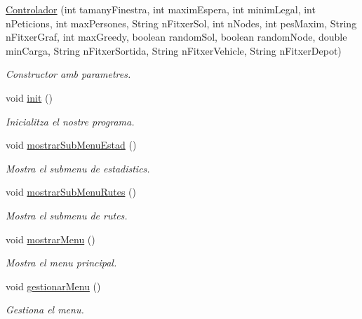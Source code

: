 \begin{DoxyCompactItemize}
\item 
\hyperlink{class_portam_a_pro_p_1_1_controlador_a262bc14ad6aa78a5d311f093227b4d9c}{Controlador} (int tamany\+Finestra, int maxim\+Espera, int minim\+Legal, int n\+Peticions, int max\+Persones, String n\+Fitxer\+Sol, int n\+Nodes, int pes\+Maxim, String n\+Fitxer\+Graf, int max\+Greedy, boolean random\+Sol, boolean random\+Node, double min\+Carga, String n\+Fitxer\+Sortida, String n\+Fitxer\+Vehicle, String n\+Fitxer\+Depot)
\begin{DoxyCompactList}\small\item\em Constructor amb parametres. \end{DoxyCompactList}\item 
void \hyperlink{class_portam_a_pro_p_1_1_controlador_a60a7be623d88c96db3e8382c4779b23a}{init} ()
\begin{DoxyCompactList}\small\item\em Inicialitza el nostre programa. \end{DoxyCompactList}\item 
void \hyperlink{class_portam_a_pro_p_1_1_controlador_aa0e7fc666e46a4ddf1856834f9e91689}{mostrar\+Sub\+Menu\+Estad} ()
\begin{DoxyCompactList}\small\item\em Mostra el submenu de estadistics. \end{DoxyCompactList}\item 
void \hyperlink{class_portam_a_pro_p_1_1_controlador_afa9baa308b66d786e6a7dde83d0e6898}{mostrar\+Sub\+Menu\+Rutes} ()
\begin{DoxyCompactList}\small\item\em Mostra el submenu de rutes. \end{DoxyCompactList}\item 
void \hyperlink{class_portam_a_pro_p_1_1_controlador_aa1c36ea47ced882290b8be0ff569e5e1}{mostrar\+Menu} ()
\begin{DoxyCompactList}\small\item\em Mostra el menu principal. \end{DoxyCompactList}\item 
void \hyperlink{class_portam_a_pro_p_1_1_controlador_af20b7a4354e0a4d5223bbbe04aff97e1}{gestionar\+Menu} ()
\begin{DoxyCompactList}\small\item\em Gestiona el menu. \end{DoxyCompactList}\item 

\end{DoxyCompactItemize}
